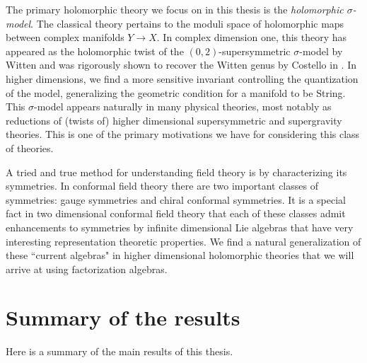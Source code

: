 The primary holomorphic theory we focus on in this thesis is the {\em holomorphic $\sigma$-model}. 
The classical theory pertains to the moduli space of holomorphic maps between complex manifolds $Y \to X$. 
In complex dimension one, this theory has appeared as the holomorphic twist of the $(0,2)$-supersymmetric $\sigma$-model by Witten \cite{WittenCDO} and was rigorously shown to recover the Witten genus by Costello in \cite{WG2}. 
In higher dimensions, we find a more sensitive invariant controlling the quantization of the model, generalizing the geometric condition for a manifold to be {\rm String}.
This $\sigma$-model appears naturally in many physical theories, most notably as reductions of (twists of) higher dimensional supersymmetric and supergravity theories.
This is one of the primary motivations we have for considering this class of theories.  

A tried and true method for understanding field theory is by characterizing its symmetries. 
In conformal field theory there are two important classes of symmetries: gauge symmetries and chiral conformal symmetries. 
It is a special fact in two dimensional conformal field theory that each of these classes admit enhancements to symmetries by infinite dimensional Lie algebras that have very interesting representation theoretic properties. 
We find a natural generalization of these ``current algebras" in higher dimensional holomorphic theories that we will arrive at using factorization algebras. 


\section{Summary of the results}

Here is a summary of the main results of this thesis.

